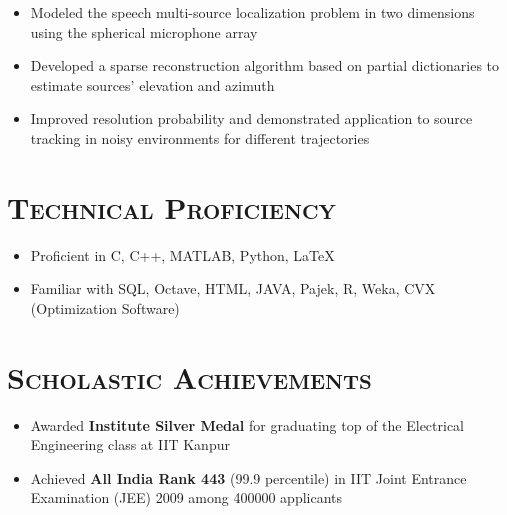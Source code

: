 \documentclass [letterpaper,10pt]{article}
\newcommand{\NewPart}[1]{\section*{\large\textsc{#1}}}
\begin{document}
\vspace{-16pt}
\begin{itemize} \itemsep -2.5pt
	\item Modeled the speech multi-source localization problem in two dimensions using the spherical microphone array
	\item Developed a sparse reconstruction algorithm based on partial dictionaries to estimate sources' elevation and azimuth
	\item Improved resolution probability and demonstrated application to source tracking in noisy environments for different trajectories
\end{itemize}
\vspace{-15pt}
\NewPart{Technical Proficiency}{}
\begin{itemize}\itemsep -2.5pt
	\item Proficient in C, C++, MATLAB, Python, \LaTeX
	\item Familiar with SQL, Octave, HTML, JAVA, Pajek, R, Weka, CVX (Optimization Software)
\end{itemize}
\vspace{-15pt}
\NewPart{Scholastic Achievements}{}
\vspace{-3pt}
\begin{itemize}\itemsep -2.5pt
	\item Awarded {\textbf{Institute Silver Medal}} for graduating top of the Electrical Engineering class at IIT Kanpur
	\item Achieved \textbf{All India Rank 443} (99.9 percentile) in IIT Joint Entrance Examination (JEE) 2009 among 400000 applicants
\end{itemize}
\end{document}
